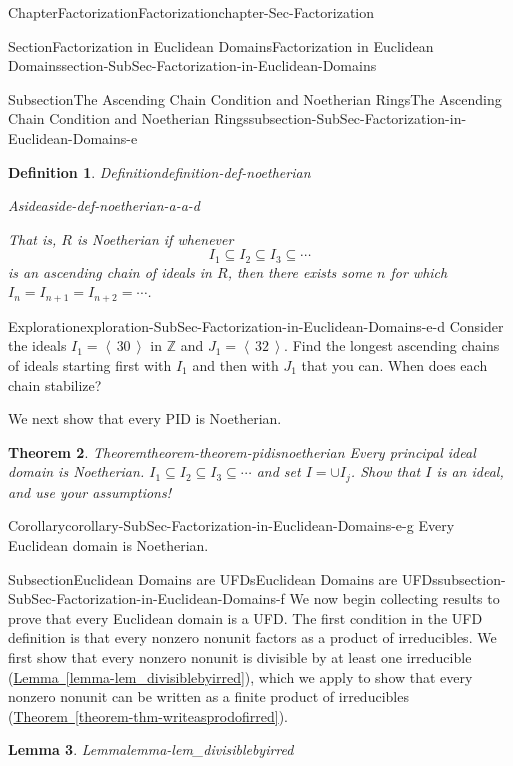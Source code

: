 \documentclass[oneside,10pt,]{book}
\newcommand{\xreffont}{\relax}
\numberwithin{equation}{section}
\newcommand{\ideal}[1]{\left\langle\, #1 \,\right\rangle}
\def\Z{{\mathbb Z}}
\newtheorem{theorem}{Theorem}[section]
\newtheorem{lemma}[theorem]{Lemma}
\newtheorem{definition}[theorem]{Definition}
\begin{document}
\begin{chapterptx}{Chapter}{Factorization}{}{Factorization}{}{}{chapter-Sec-Factorization}
\begin{sectionptx}{Section}{Factorization in Euclidean Domains}{}{Factorization in Euclidean Domains}{}{}{section-SubSec-Factorization-in-Euclidean-Domains}
\begin{subsectionptx}{Subsection}{The Ascending Chain Condition and Noetherian Rings}{}{The Ascending Chain Condition and Noetherian Rings}{}{}{subsection-SubSec-Factorization-in-Euclidean-Domains-e}
\begin{definition}{Definition}{}{definition-def-noetherian}
\begin{aside}{Aside}{}{aside-def-noetherian-a-a-d}
\end{aside}
 That is, \(R\) is Noetherian if whenever%
\begin{equation*}
I_1 \subseteq I_2\subseteq I_3\subseteq \cdots
\end{equation*}
is an ascending chain of ideals in \(R\), then there exists some \(n\) for which \(I_n = I_{n+1} = I_{n+2} = \cdots\).%
\end{definition}
%
\begin{exploration}{Exploration}{}{exploration-SubSec-Factorization-in-Euclidean-Domains-e-d}%
Consider the ideals \(I_1 = \ideal{30}\) in \(\Z\) and \(J_1 = \ideal{32}\). Find the longest ascending chains of ideals starting first with \(I_1\) and then with \(J_1\) that you can. When does each chain stabilize?%
\end{exploration}%
We next show that every PID is Noetherian.%
\begin{theorem}{Theorem}{}{}{theorem-theorem-pidisnoetherian}%
Every principal ideal domain is Noetherian.%
\noindentLet \(I_1\subseteq I_2\subseteq I_3 \subseteq \cdots\) and set \(I = \cup I_j\). Show that \(I\) is an ideal, and use your assumptions!%
\end{theorem}
\begin{corollary}{Corollary}{}{}{corollary-SubSec-Factorization-in-Euclidean-Domains-e-g}%
Every Euclidean domain is Noetherian.%
\end{corollary}
\end{subsectionptx}
%
%
\typeout{************************************************}
\typeout{************************************************}
%
\begin{subsectionptx}{Subsection}{Euclidean Domains are UFDs}{}{Euclidean Domains are UFDs}{}{}{subsection-SubSec-Factorization-in-Euclidean-Domains-f}
We now begin collecting results to prove that every Euclidean domain is a UFD. The first condition in the UFD definition is that every nonzero nonunit factors as a product of irreducibles. We first show that every nonzero nonunit is divisible by at least one irreducible (\hyperref[lemma-lem_divisiblebyirred]{Lemma~{\xreffont\ref{lemma-lem_divisiblebyirred}}}), which we apply to show that every nonzero nonunit can be written as a finite product of irreducibles (\hyperref[theorem-thm-writeasprodofirred]{Theorem~{\xreffont\ref{theorem-thm-writeasprodofirred}}}).%
\begin{lemma}{Lemma}{}{}{lemma-lem_divisiblebyirred}%

\end{lemma}
\end{subsectionptx}
\end{sectionptx}
\end{chapterptx}
\end{document}

